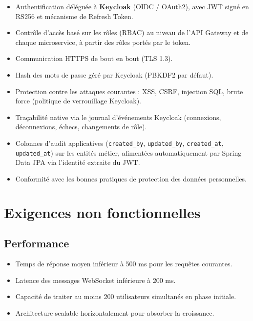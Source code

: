 \documentclass[12pt,a4paper]{article}
\begin{document}
\begin{itemize}[leftmargin=*,itemsep=4pt]
    \item Authentification déléguée à \textbf{Keycloak} (OIDC / OAuth2), avec JWT signé en RS256 et mécanisme de Refresh Token.
    \item Contrôle d'accès basé sur les rôles (RBAC) au niveau de l'API Gateway et de chaque microservice, à partir des rôles portés par le token.
    \item Communication HTTPS de bout en bout (TLS 1.3).
    \item Hash des mots de passe géré par Keycloak (PBKDF2 par défaut).
    \item Protection contre les attaques courantes : XSS, CSRF, injection SQL, brute force (politique de verrouillage Keycloak).
    \item Traçabilité native via le journal d'événements Keycloak (connexions, déconnexions, échecs, changements de rôle).
    \item Colonnes d'audit applicatives (\texttt{created\_by}, \texttt{updated\_by}, \texttt{created\_at}, \texttt{updated\_at}) sur les entités métier, alimentées automatiquement par Spring Data JPA via l'identité extraite du JWT.
    \item Conformité avec les bonnes pratiques de protection des données personnelles.
\end{itemize}

\newpage

\section{Exigences non fonctionnelles}

\subsection{Performance}

\begin{itemize}[leftmargin=*,itemsep=4pt]
    \item Temps de réponse moyen inférieur à 500 ms pour les requêtes courantes.
    \item Latence des messages WebSocket inférieure à 200 ms.
    \item Capacité de traiter au moins 200 utilisateurs simultanés en phase initiale.
    \item Architecture scalable horizontalement pour absorber la croissance.
\end{itemize}
\end{document}
